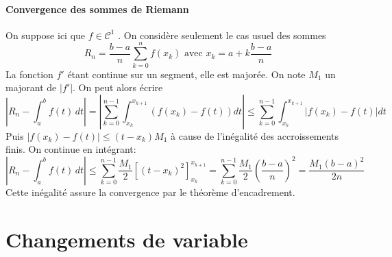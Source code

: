 \paragraph{Convergence des sommes de Riemann }
On suppose ici que $f \in \mathcal{C}^1$ . On considère seulement le cas usuel des sommes
\begin{displaymath}
  R_n = \frac{b-a}{n}\sum_{k = 0}^{n}f(x_k) \text{ avec } x_k  = a + k\frac{b-a}{n}
\end{displaymath}
La fonction $f'$ étant continue sur un segment, elle est majorée. On note $M_1$ un majorant de $|f'|$. On peut alors écrire
\begin{displaymath}
  \left|R_n - \int_{a}^{b}f(t)\,dt\right| 
= \left|\sum_{k=0}^{n-1}\int_{x_k}^{x_{k+1}}\left( f(x_k) - f(t)\right) dt\right| 
\leq \sum_{k=0}^{n-1}\int_{x_k}^{x_{k+1}}\left|f(x_k) - f(t)\right|dt
\end{displaymath}
Puis $\left|f(x_k) - f(t)\right|\leq (t-x_k)M_1$ à cause de l'inégalité des accroissements finis. On continue en intégrant:
\begin{displaymath}
  \left|R_n - \int_{a}^{b}f(t)\,dt\right| 
\leq \sum_{k=0}^{n-1}\frac{M_1}{2}\left[ (t-x_k)^2\right]_{x_k}^{x_{k+1}}
=\sum_{k=0}^{n-1}\frac{M_1}{2}\left(\frac{b-a}{n} \right)^2
=\frac{M_1(b-a)^2}{2n}
\end{displaymath}
Cette inégalité assure la convergence par le théorème d'encadrement.

\section{Changements de variable}
